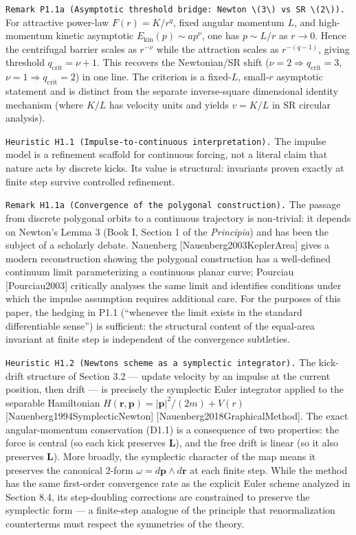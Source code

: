 \documentclass[
]{article}
\begin{document}
\texttt{Remark\ P1.1a\ (Asymptotic\ threshold\ bridge:\ Newton\ \textbackslash{}(3\textbackslash{})\ vs\ SR\ \textbackslash{}(2\textbackslash{})).}
For attractive power-law \(F(r)=K/r^q\), fixed angular momentum \(L\),
and high-momentum kinetic asymptotic
\(E_{\mathrm{kin}}(p)\sim a p^\nu\), one has \(p\sim L/r\) as \(r\to0\).
Hence the centrifugal barrier scales as \(r^{-\nu}\) while the
attraction scales as \(r^{-(q-1)}\), giving threshold
\(q_{\mathrm{crit}}=\nu+1\). This recovers the Newtonian/SR shift
(\(\nu=2\Rightarrow q_{\mathrm{crit}}=3\),
\(\nu=1\Rightarrow q_{\mathrm{crit}}=2\)) in one line. The criterion is
a fixed-\(L\), small-\(r\) asymptotic statement and is distinct from the
separate inverse-square dimensional identity mechanism (where \(K/L\)
has velocity units and yields \(v=K/L\) in SR circular analysis).

\texttt{Heuristic\ H1.1\ (Impulse-to-continuous\ interpretation).} The
impulse model is a refinement scaffold for continuous forcing, not a
literal claim that nature acts by discrete kicks. Its value is
structural: invariants proven exactly at finite step survive controlled
refinement.

\texttt{Remark\ H1.1a\ (Convergence\ of\ the\ polygonal\ construction).}
The passage from discrete polygonal orbits to a continuous trajectory is
non-trivial: it depends on Newton's Lemma 3 (Book I, Section 1 of the
\emph{Principia}) and has been the subject of a scholarly debate.
Nauenberg {[}Nauenberg2003KeplerArea{]} gives a modern reconstruction
showing the polygonal construction has a well-defined continuum limit
parameterizing a continuous planar curve; Pourciau {[}Pourciau2003{]}
critically analyses the same limit and identifies conditions under which
the impulse assumption requires additional care. For the purposes of
this paper, the hedging in P1.1 (``whenever the limit exists in the
standard differentiable sense'') is sufficient: the structural content
of the equal-area invariant at finite step is independent of the
convergence subtleties.

\texttt{Heuristic\ H1.2\ (Newton\textquotesingle{}s\ scheme\ as\ a\ symplectic\ integrator).}
The kick-drift structure of Section 3.2 --- update velocity by an
impulse at the current position, then drift --- is precisely the
symplectic Euler integrator applied to the separable Hamiltonian
\(H(\mathbf r,\mathbf p)=|\mathbf p|^2/(2m)+V(r)\)
{[}Nauenberg1994SymplecticNewton{]} {[}Nauenberg2018GraphicalMethod{]}.
The exact angular-momentum conservation (D1.1) is a consequence of two
properties: the force is central (so each kick preserves \(\mathbf L\)),
and the free drift is linear (so it also preserves \(\mathbf L\)). More
broadly, the symplectic character of the map means it preserves the
canonical 2-form \(\omega=d\mathbf p\wedge d\mathbf r\) at each finite
step. While the method has the same first-order convergence rate as the
explicit Euler scheme analyzed in Section 8.4, its step-doubling
corrections are constrained to preserve the symplectic form --- a
finite-step analogue of the principle that renormalization counterterms
must respect the symmetries of the theory.
\end{document}
